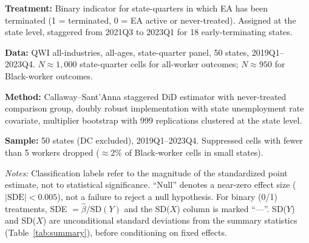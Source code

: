 \documentclass[12pt]{article}
\begin{document}
\noindent\textbf{Treatment:} Binary indicator for state-quarters in which EA has been terminated (1 = terminated, 0 = EA active or never-treated). Assigned at the state level, staggered from 2021Q3 to 2023Q1 for 18 early-terminating states.

\noindent\textbf{Data:} QWI all-industries, all-ages, state-quarter panel, 50 states, 2019Q1--2023Q4. $N \approx 1{,}000$ state-quarter cells for all-worker outcomes; $N \approx 950$ for Black-worker outcomes.

\noindent\textbf{Method:} Callaway--Sant'Anna staggered DiD estimator with never-treated comparison group, doubly robust implementation with state unemployment rate covariate, multiplier bootstrap with 999 replications clustered at the state level.

\noindent\textbf{Sample:} 50 states (DC excluded), 2019Q1--2023Q4. Suppressed cells with fewer than 5 workers dropped ($\approx 2\%$ of Black-worker cells in small states).

{\footnotesize \emph{Notes:} Classification labels refer to the magnitude of the standardized point estimate, not to statistical significance. ``Null'' denotes a near-zero effect size ($|\text{SDE}| < 0.005$), not a failure to reject a null hypothesis. For binary (0/1) treatments, SDE $= \hat{\beta} / \text{SD}(Y)$ and the SD($X$) column is marked ``---''. SD($Y$) and SD($X$) are unconditional standard deviations from the summary statistics (Table~\ref{tab:summary}), before conditioning on fixed effects.}
\end{document}
